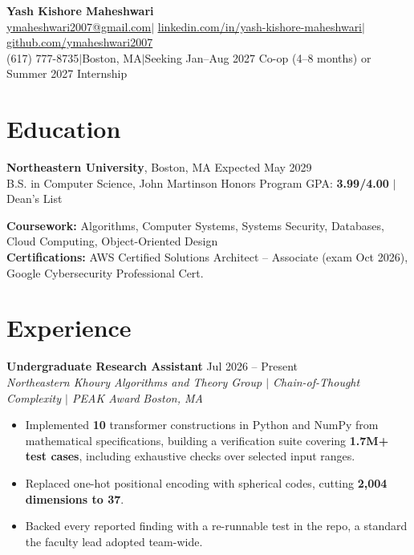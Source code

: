 \documentclass[letterpaper,10pt]{article}
\let\hrefplain\href
\renewcommand{\href}[2]{\hrefplain{#1}{\uline{#2}}}
\newcommand{\entrysize}{\fontsize{10.5}{12}\selectfont}
\newif\ifentrygap
\newcommand{\entrygapsize}{6pt}
\newcommand{\entryfirstgap}{0.4pt}
\newcommand{\entrysep}{\ifentrygap\vspace{\entrygapsize}\else\vspace{\entryfirstgap}\fi\global\entrygaptrue}
\let\entryorigsection\section
\renewcommand{\section}{\global\entrygapfalse\entryorigsection}
\newcommand{\entry}[4]{\entrysep{\entrysize\textbf{#1}} \hfill #2 \\ \textit{#3} \hfill \textit{#4}}
\newcommand{\hsep}{\hspace{0.2222em minus 0.1em}$\vert$\hspace{0.2222em minus 0.1em}}
\begin{document}
\begin{center}
  {\fontsize{18}{20}\selectfont\bfseries Yash Kishore Maheshwari}\\[3pt]
  \href{mailto:ymaheshwari2007@gmail.com}{ymaheshwari2007@gmail.com}\hsep%
  \href{https://linkedin.com/in/yash-kishore-maheshwari}{linkedin.com/in/yash-kishore-maheshwari}\hsep%
  \href{https://github.com/ymaheshwari2007}{github.com/ymaheshwari2007}\\
  (617) 777-8735\hsep Boston, MA\hsep Seeking Jan--Aug 2027 Co-op (4--8 months) or Summer 2027 Internship
\end{center}

\section{Education}

\textbf{Northeastern University}, Boston, MA \hfill Expected May 2029 \\
B.S. in Computer Science, John Martinson Honors Program \hfill
GPA: \textbf{3.99/4.00} $\vert$ Dean's List

\vspace{1pt}
\textbf{Coursework:} Algorithms, Computer Systems, Systems Security, Databases, Cloud Computing, Object-Oriented Design \\
{\fontsize{9.5}{11}\selectfont\textbf{Certifications:} AWS Certified Solutions Architect -- Associate (exam Oct 2026), Google Cybersecurity Professional Cert.}

\section{Experience}

\entry{Undergraduate Research Assistant}{Jul 2026 -- Present}
      {Northeastern Khoury Algorithms and Theory Group $\vert$ Chain-of-Thought Complexity $\vert$ PEAK Award}{Boston, MA}
\begin{itemize}
  \item Implemented \textbf{10} transformer constructions in Python and NumPy from mathematical specifications, building a
        verification suite covering \textbf{1.7M+ test cases}, including exhaustive checks over selected input ranges.
  \item Replaced one-hot positional encoding with spherical codes, cutting \textbf{2,004 dimensions to 37}.
  \item Backed every reported finding with a re-runnable test in the repo, a standard the faculty lead adopted team-wide.
\end{itemize}
\end{document}
